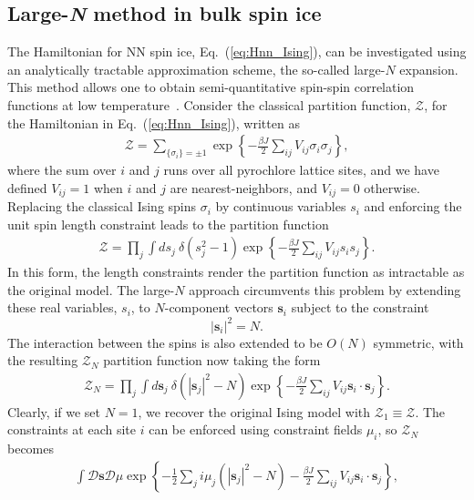 \documentclass[aps,prx,reprint,runinaddress,superscriptaddress,amsmath,amssymb,floatfix,longbibliography]{revtex4-1}
\renewcommand{\vec}[1]{\boldsymbol{#1}}
\begin{document}
\subsection{Large-\emph{N} method in bulk spin ice}
\label{sec:methods:bulk}
The Hamiltonian for \ac{NN} spin ice, Eq.~(\ref{eq:Hnn_Ising}), can be investigated using an analytically tractable approximation scheme, the so-called large-$N$ expansion. This method allows one to obtain semi-quantitative spin-spin correlation functions at low temperature~\cite{Isakov2004}.
Consider the classical partition function, $\mathcal{Z}$, for the Hamiltonian in Eq.~(\ref{eq:Hnn_Ising}), written as
\begin{align}
\mathcal{Z} = \sum_{ \{\sigma_i\} = \pm 1 } \exp \left\{-\frac{\beta J}{2} \sum_{ij} V_{ij} \sigma_i \sigma_j \right\} ,
\label{eq:Z_largeN}	
\end{align}
where the sum over $i$ and $j$ runs over all pyrochlore lattice sites, and we have defined $V_{ij} = 1$ when $i$ and $j$ are nearest-neighbors, and $V_{ij} = 0$ otherwise.
Replacing the classical Ising spins $\sigma_i$ by continuous variables $s_i$ and enforcing the unit spin length constraint leads to the partition function
\begin{align}
\mathcal{Z} = \prod_{j} \int  ds_j\ \delta(s_j^2 - 1) \exp \left\{-\frac{\beta J}{2} \sum_{ij} V_{ij} s_i s_j \right\} .
\end{align}
In this form, the length constraints render the partition function as intractable as the original model. The large-$N$ approach circumvents this problem by extending these real variables, $s_i$, to $N$-component vectors $\vec{s}_i$ subject to the constraint
\begin{equation}
|\vec{s}_i|^2 = N .
\label{eq:selfconsistency_realspace}
\end{equation}
%
The interaction between the spins is also extended to be $O(N)$ symmetric, with the resulting $\mathcal{Z}_N$ partition function now taking the form
%
\begin{align}
\mathcal{Z}_N = \prod_{j} \int  d\vec{s}_j\ \delta(|\vec{s}_j|^2 - N) \exp \left\{-\frac{\beta J}{2} \sum_{ij} V_{ij} \vec{s}_i \cdot \vec{s}_j \right\} .
\label{eq:Z_largeN_si}	
\end{align}
Clearly, if we set $N=1$, we recover the original Ising model with $\mathcal{Z}_1 \equiv \mathcal{Z}$. The constraints at each site $i$ can be enforced using constraint fields $\mu_i$, so $\mathcal{Z}_N$ becomes
\begin{align*}
 \int \mathcal{D}\vec{s} \mathcal{D}\mu
 \exp \left\{ 
 -\frac{1}{2}\sum_j i \mu_j \left(|\vec{s}_j|^2-N\right) 
 -\frac{\beta J}{2} \sum_{ij} V_{ij} \vec{s}_i \cdot \vec{s}_j
 \right\},
\end{align*}
\end{document}
